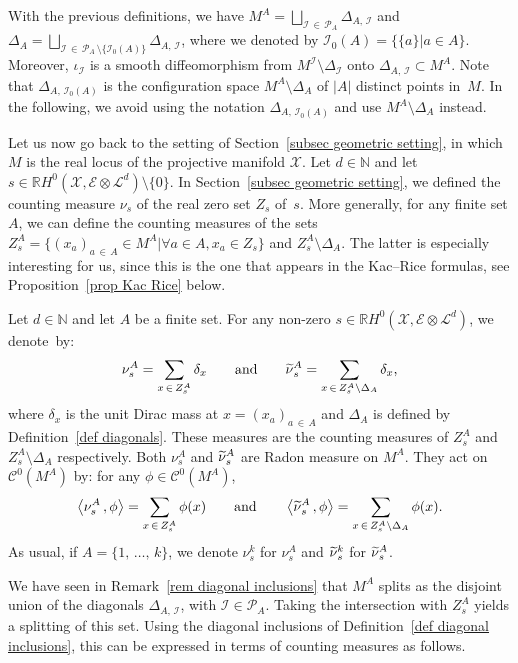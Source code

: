 \documentclass[AHL,Unicode,longabstracts,published]{cedram}
\newcommand{\E}{\mathcal{E}}
\newcommand{\I}{\mathcal{I}}
\newcommand{\X}{\mathcal{X}}
\renewcommand{\L}{\mathcal{L}}
\newcommand{\clC}{\mathcal{C}}
\newcommand{\pa}{\mathcal{P}\!}
\newcommand{\N}{\mathbb{N}}
\newcommand{\R}{\mathbb{R}}
\newcommand{\prsc}[2]{\left\langle #1\,, #2 \right\rangle}
\renewcommand{\H}{H^0(\X,\E \otimes \L^d)}
\renewcommand{\tilde}{\widetilde}
\let\oldtilde\tilde
\renewcommand*{\tilde}[1]{\mathchoice{\widetilde{#1}}{\widetilde{#1}}{\oldtilde{#1}}{\oldtilde{#1}}}
\let\oldforall\forall
\renewcommand*{\forall}{\mathrel{\oldforall}}
\begin{document}
\begin{rema}\label{rem diagonal inclusions}
With the previous definitions, we have $M^A = \bigsqcup_{\I\,\in\,\pa_A} \Delta_{A,\,\I}$ and $\Delta_A = \bigsqcup_{\I\,\in\,\pa_A\,\setminus \{\I_0(A)\}} \Delta_{A,\,\I}$, where we denoted by $\I_0(A)= \{ \{a\} \vert a \in A\}$. Moreover, $\iota_\I$ is a smooth diffeomorphism from $M^\I \setminus \Delta_\I$ onto $\Delta_{A,\,\I} \subset M^A$. Note that $\Delta_{A,\,\I_0(A)}$ is the configuration space $M^A \setminus \Delta_A$ of $|A|$ distinct points in~$M$. In the following, we avoid using the notation $\Delta_{A,\,\I_0(A)}$ and use $M^A \setminus \Delta_A$ instead.
\end{rema}

Let us now go back to the setting of Section~\ref{subsec geometric setting}, in which $M$ is the real locus of the projective manifold $\X$. Let $d \in \N$ and let $s \in \R\H \setminus \{0\}$. In Section~\ref{subsec geometric setting}, we defined the counting measure $\nu_s$ of the real zero set $Z_s$ of~$s$. More generally, for any finite set $A$, we can define the counting measures of the sets $Z_s^A = \{(x_a)_{a\,\in \,A} \in M^A \vert \forall a \in A, x_a \in Z_s \}$ and $Z_s^A \setminus \Delta_A$. The latter is especially interesting for us, since this is the one that appears in the Kac--Rice formulas, see Proposition~\ref{prop Kac Rice} below.

\begin{defi}\label{def nu A}
Let $d \in \N$ and let $A$ be a finite set. For any non-zero $s \in \R\H$, we denote~by:
\[
\nu^A_s = \sum_{x\,\in\,Z_s^A} \delta_x \qquad\text{and}\qquad \tilde{\nu}^A_s = \sum_{x\,\in\,Z_s^A\setminus\Delta_A} \delta_x,
\]where $\delta_x$ is the unit Dirac mass at $x =(x_a)_{a\,\in\,A}$ and $\Delta_A$ is defined by Definition~\ref{def diagonals}. These measures are the counting measures of $Z_s^A$ and $Z_s^A \setminus \Delta_A$ respectively. Both $\nu^A_s$ and $\tilde{\nu}^A_s$ are Radon measure on $M^A$. They act on $\clC^0(M^A)$ by: for any $\phi \in \clC^0(M^A)$,
\[
\prsc{\nu^A_s}{\phi} = \sum_{x\,\in\,Z_s^A} \phi(x) \qquad\text{and} \qquad \prsc{\tilde{\nu}^A_s}{\phi} = \sum_{x\,\in\,Z_s^A\setminus \Delta_A} \phi(x).
\]
As usual, if $A = \{1,\,\dots,\,k\}$, we denote $\nu^k_s$ for $\nu^A_s$ and $\tilde{\nu}^k_s$ for $\tilde{\nu}^A_s$.
\end{defi}

We have seen in Remark~\ref{rem diagonal inclusions} that $M^A$ splits as the disjoint union of the diagonals $\Delta_{A,\,\I}$, with $\I \in \pa_A$. Taking the intersection with $Z_s^A$ yields a splitting of this set. Using the diagonal inclusions of Definition~\ref{def diagonal inclusions}, this can be expressed in terms of counting measures as follows.
\end{document}
